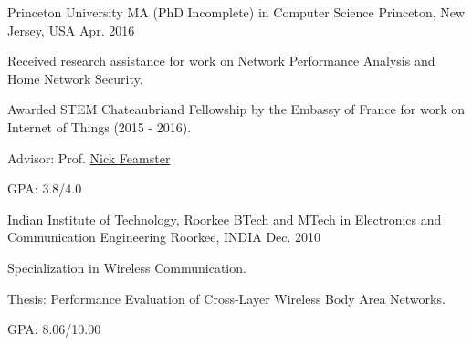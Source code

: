 

\begin{cventries}

\cventry
    {Princeton University} %
    {MA (PhD Incomplete) in Computer Science} %
    {Princeton, New Jersey, USA} %
    {Apr. 2016} %
    {
      \begin{cvitems} %
      	\item {Received research assistance for work on Network Performance Analysis and Home Network Security.}
      	\item {Awarded STEM Chateaubriand Fellowship by the Embassy of France for work on Internet of Things (2015 - 2016).}
      	\item {Advisor: Prof. \href{https://www.cs.princeton.edu/~feamster}{Nick Feamster}}
      	\item {GPA: 3.8/4.0}
      \end{cvitems}
    }

\cventry  
    {Indian Institute of Technology, Roorkee} %
    {BTech and MTech in Electronics and Communication Engineering} %
    {Roorkee, INDIA} %
    {Dec. 2010} %
    {
      \begin{cvitems} %
      	\item {Specialization in Wireless Communication.}
      	\item {Thesis: Performance Evaluation of Cross-Layer Wireless Body Area Networks.}
      	\item {GPA: 8.06/10.00}
      \end{cvitems}
    }

\end{cventries}

